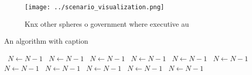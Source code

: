 \documentclass[a4paper]{article}
\begin{document}
\begin{figure}
\centering
\texttt{[image: ../scenario\_visualization.png]}
\caption{Knx other spheres o government where executive au
}
\end{figure}
 
\begin{algorithm}
\caption{An algorithm with caption}
\begin{algorithmic}
\    \State $N \gets N - 1$
\    \State $N \gets N - 1$
\    \State $N \gets N - 1$
\    \State $N \gets N - 1$
\    \State $N \gets N - 1$
\    \State $N \gets N - 1$
\    \State $N \gets N - 1$
\    \State $N \gets N - 1$
\    \State $N \gets N - 1$
\    \State $N \gets N - 1$
\    \State $N \gets N - 1$
\EndWhile
\end{algorithmic}
\end{algorithm}
\end{document}
